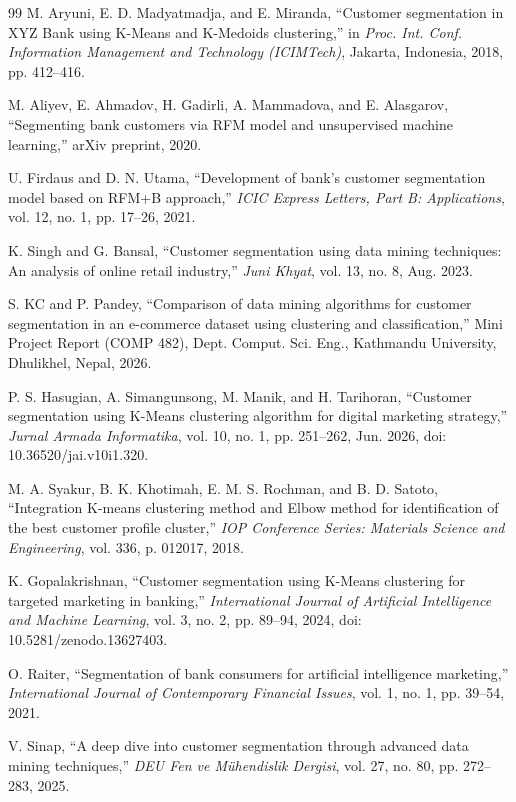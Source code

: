 \documentclass[conference]{IEEEtran}
\begin{document}
\begin{thebibliography}{99}
M. Aryuni, E. D. Madyatmadja, and E. Miranda, ``Customer segmentation in XYZ Bank using K-Means and K-Medoids clustering,'' in \textit{Proc. Int. Conf. Information Management and Technology (ICIMTech)}, Jakarta, Indonesia, 2018, pp. 412--416.

M. Aliyev, E. Ahmadov, H. Gadirli, A. Mammadova, and E. Alasgarov, ``Segmenting bank customers via RFM model and unsupervised machine learning,'' arXiv preprint, 2020.

U. Firdaus and D. N. Utama, ``Development of bank's customer segmentation model based on RFM+B approach,'' \textit{ICIC Express Letters, Part B: Applications}, vol. 12, no. 1, pp. 17--26, 2021.

K. Singh and G. Bansal, ``Customer segmentation using data mining techniques: An analysis of online retail industry,'' \textit{Juni Khyat}, vol. 13, no. 8, Aug. 2023.

S. KC and P. Pandey, ``Comparison of data mining algorithms for customer segmentation in an e-commerce dataset using clustering and classification,'' Mini Project Report (COMP 482), Dept. Comput. Sci. Eng., Kathmandu University, Dhulikhel, Nepal, 2026.

P. S. Hasugian, A. Simangunsong, M. Manik, and H. Tarihoran, ``Customer segmentation using K-Means clustering algorithm for digital marketing strategy,'' \textit{Jurnal Armada Informatika}, vol. 10, no. 1, pp. 251--262, Jun. 2026, doi: 10.36520/jai.v10i1.320.

M. A. Syakur, B. K. Khotimah, E. M. S. Rochman, and B. D. Satoto, ``Integration K-means clustering method and Elbow method for identification of the best customer profile cluster,'' \textit{IOP Conference Series: Materials Science and Engineering}, vol. 336, p. 012017, 2018.

K. Gopalakrishnan, ``Customer segmentation using K-Means clustering for targeted marketing in banking,'' \textit{International Journal of Artificial Intelligence and Machine Learning}, vol. 3, no. 2, pp. 89--94, 2024, doi: 10.5281/zenodo.13627403.

O. Raiter, ``Segmentation of bank consumers for artificial intelligence marketing,'' \textit{International Journal of Contemporary Financial Issues}, vol. 1, no. 1, pp. 39--54, 2021.

V. Sinap, ``A deep dive into customer segmentation through advanced data mining techniques,'' \textit{DEU Fen ve M\"{u}hendislik Dergisi}, vol. 27, no. 80, pp. 272--283, 2025.


\end{thebibliography}
\end{document}
